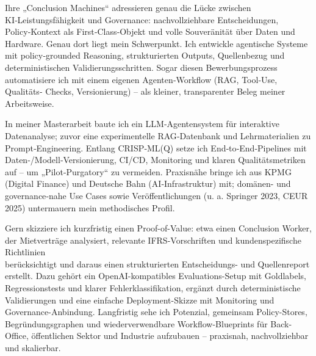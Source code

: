 Ihre „Conclusion Machines“ adressieren genau die Lücke zwischen KI‑Leistungsfähigkeit und Governance: nachvollziehbare Entscheidungen, Policy‑Kontext als First‑Class‑Objekt und volle Souveränität über Daten und Hardware. Genau dort liegt mein Schwerpunkt. Ich entwickle agentische Systeme mit policy‑grounded Reasoning, strukturierten Outputs, Quellenbezug und deterministischen Validierungsschritten. Sogar diesen Bewerbungsprozess automatisiere ich mit einem eigenen Agenten‑Workflow (RAG, Tool‑Use, Qualitäts‑ Checks, Versionierung) – als kleiner, transparenter Beleg meiner Arbeitsweise.

In meiner Masterarbeit baute ich ein LLM‑Agentensystem für interaktive Datenanalyse; zuvor eine experimentelle RAG‑Datenbank und Lehrmaterialien zu Prompt‑Engineering. Entlang CRISP‑ML(Q) setze ich End‑to‑End‑Pipelines mit Daten-/Modell‑Versionierung, CI/CD, Monitoring und klaren Qualitätsmetriken auf – um „Pilot‑Purgatory“ zu vermeiden. Praxisnähe bringe ich aus KPMG (Digital Finance) und Deutsche Bahn (AI‑Infrastruktur) mit; domänen- und governance‑nahe Use Cases sowie Veröffentlichungen (u. a. Springer 2023, CEUR 2025) untermauern mein methodisches Profil.

Gern skizziere ich kurzfristig einen Proof-of-Value: etwa einen Conclusion Worker, der Mietverträge analysiert, relevante IFRS-Vorschriften und kundenspezifische Richtlinien \\ berücksichtigt und daraus einen strukturierten Entscheidungs- und Quellenreport erstellt.
Dazu gehört ein OpenAI-kompatibles Evaluations-Setup mit Goldlabels, Regressionstests und klarer Fehlerklassifikation, ergänzt durch deterministische Validierungen und eine einfache Deployment-Skizze mit Monitoring und Governance-Anbindung.
Langfristig sehe ich Potenzial, gemeinsam Policy-Stores, Begründungsgraphen und wiederverwendbare Workflow-Blueprints für Back-Office, öffentlichen Sektor und Industrie aufzubauen – praxisnah, nachvollziehbar und skalierbar.